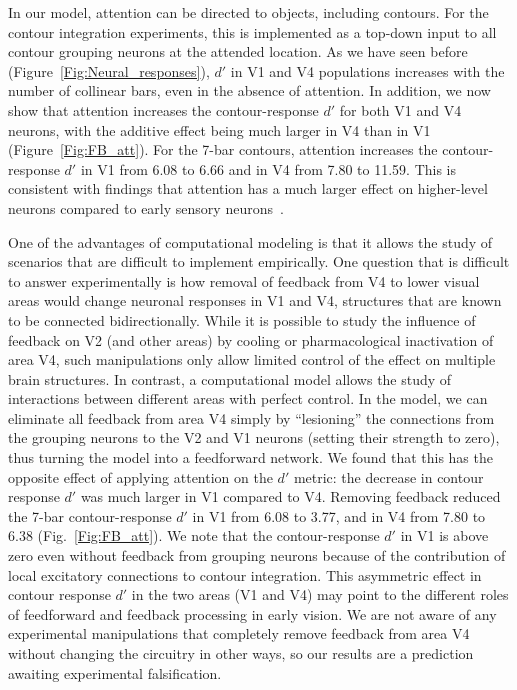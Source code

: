 In our model, attention can be directed to objects, including
contours. For the contour integration experiments, this is implemented  as a top-down input to all contour grouping neurons at the attended location.
As we have seen before (Figure~\ref{Fig:Neural_responses}), $d'$ in V1
and V4 populations increases with the number of collinear bars, even
in the absence of attention.  In addition, we now show that attention
increases the contour-response $d'$ for both V1 and V4 neurons, with
the additive effect being much larger in V4 than in V1
(Figure~\ref{Fig:FB_att}). For the 7-bar contours, attention increases
the contour-response $d'$ in V1 from 6.08 to 6.66 and in V4 from 7.80
to 11.59. This is consistent with findings that attention has a much
larger effect on higher-level neurons compared to early sensory
neurons~\citep[review:][]{Treue01}.

One of the advantages of computational modeling is that it allows the
study of scenarios that are difficult to implement empirically.
One question that is difficult to answer experimentally is how removal of
feedback 
from V4 to lower visual areas
would change neuronal responses in V1 and V4, structures that
are known to be connected bidirectionally.
While it is possible to study the influence of feedback on V2 (and
other areas) by cooling \citep{Hupe_etal98} or pharmacological
inactivation \citep{Jansen_etal12} of area V4, such manipulations only
allow limited control of the effect on multiple brain structures. In
contrast, a computational model allows the study of interactions
between different areas with perfect control. In the model, 
we can eliminate all feedback from area V4 simply by ``lesioning'' the
connections from the grouping neurons to the V2 and V1 neurons
(setting their strength to zero), thus turning the model into a
feedforward network.  We found that this has the opposite effect of
applying attention on the $d'$ metric: the decrease in contour
response $d'$ was much larger in V1 compared to V4. Removing feedback
reduced the 7-bar contour-response $d'$ in V1 from 6.08 to 3.77, and
in V4 from 7.80 to 6.38 (Fig.~\ref{Fig:FB_att}). We note that the
contour-response $d'$ in V1 is above zero even without feedback from
grouping neurons because of the contribution of local excitatory
connections to contour integration.  This asymmetric effect in contour
response $d'$ in the two areas (V1 and V4) may point to the different
roles of feedforward and feedback processing in early vision. We are
not aware of any experimental manipulations that completely remove
feedback from area V4 without changing the circuitry in other ways, so
our results are a prediction awaiting experimental falsification.

